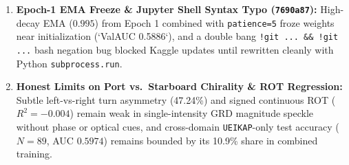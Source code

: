 \documentclass[11pt,a4paper]{article}
\begin{document}
\begin{enumerate}[leftmargin=1.5em]
    \item \textbf{Epoch-1 EMA Freeze \& Jupyter Shell Syntax Typo (\texttt{7690a87}):} High-decay EMA ($0.995$) from Epoch 1 combined with \texttt{patience=5} froze weights near initialization (`ValAUC 0.5886`), and a double bang \texttt{!git ... \&\& !git ...} bash negation bug blocked Kaggle updates until rewritten cleanly with Python \texttt{subprocess.run}.
    \item \textbf{Honest Limits on Port vs.\ Starboard Chirality \& ROT Regression:} Subtle left-vs-right turn asymmetry (47.24\%) and signed continuous ROT ($R^2=-0.004$) remain weak in single-intensity GRD magnitude speckle without phase or optical cues, and cross-domain \texttt{UEIKAP}-only test accuracy ($N=89$, AUC $0.5974$) remains bounded by its 10.9\% share in combined training.
\end{enumerate}

\begin{table}[H]
\centering
\caption{Forensic Root-Cause Audit Comparing Run 1 (\texttt{fcaab1e}), Failed Run 2 (\texttt{c0ebe12}), and Clean Run (\texttt{7690a87})}
\label{tab:forensic_audit}
{\small
{}
}
\end{table}

\end{document}
